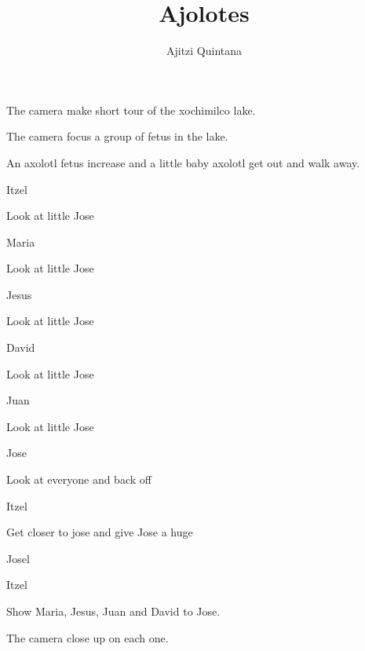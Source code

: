 \documentclass{screenplay}[2012/06/30]
\title{Ajolotes}
\author{Ajitzi Quintana}
\begin{document}
\coverpage

\fadein


The camera make short tour of the xochimilco lake.

The camera focus a group of fetus in the lake.

An axolotl fetus increase and a little baby axolotl get out and walk away.

\begin{dialogue}[excited]{Itzel}
\end{dialogue}

Look at little Jose

\begin{dialogue}[amazed]{Maria}
\end{dialogue}

Look at little Jose

\begin{dialogue}[impressed]{Jesus}
\end{dialogue}

Look at little Jose

\begin{dialogue}[scared]{David}
\end{dialogue}

Look at little Jose

\begin{dialogue}[disgusted]{Juan}
\end{dialogue}

Look at little Jose

\begin{dialogue}[scared]{Jose}
\end{dialogue}

Look at everyone and back off

\begin{dialogue}{Itzel}
\end{dialogue}

Get closer to jose and give Jose a huge

\begin{dialogue}[confused]{Josel}
\end{dialogue}

\begin{dialogue}{Itzel}
\end{dialogue}

Show Maria, Jesus, Juan and David to Jose.

The camera close up on each one.
\end{document}
